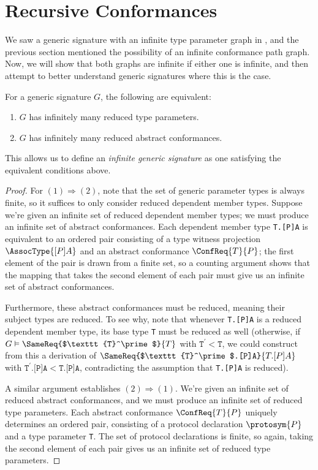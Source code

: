 \documentclass[../generics]{subfiles}
\begin{document}
\section{Recursive Conformances}\label{recursive conformances}

We saw a generic signature with an infinite type parameter graph in , and the previous section mentioned the possibility of an infinite conformance path graph. Now, we will show that both graphs are infinite if either one is infinite, and then attempt to better understand generic signatures where this is the case.

\begin{proposition}\label{infinite signature lemma} For a generic signature $G$, the following are equivalent:
\begin{enumerate}
\item $G$ has infinitely many reduced type parameters.
\item $G$ has infinitely many reduced abstract conformances.
\end{enumerate}
This allows us to define an \emph{infinite generic signature} as one satisfying the equivalent conditions above.
\end{proposition}
\begin{proof}
For $(1)\Rightarrow(2)$, note that the set of generic parameter types is always finite, so it suffices to only consider reduced dependent member types. Suppose we're given an infinite set of reduced dependent member types; we must produce an infinite set of abstract conformances. Each dependent member type \texttt{T.[P]A} is equivalent to an ordered pair consisting of a type witness projection $\AssocType{[P]A}$ and an abstract conformance $\ConfReq{T}{P}$; the first element of the pair is drawn from a finite set, so a counting argument shows that the mapping that takes the second element of each pair must give us an infinite set of abstract conformances.

Furthermore, these abstract conformances must be reduced, meaning their subject types are reduced. To see why, note that whenever \texttt{T.[P]A} is a reduced dependent member type, its base type \texttt{T} must be reduced as well (otherwise, if $G\vDash\SameReq{$\texttt{T}^\prime$}{T}$ with $\texttt{T}^\prime<\texttt{T}$, we could construct from this a derivation of $\SameReq{$\texttt{T}^\prime$.[P]A}{T.[P]A}$ with $\texttt{$\texttt{T}^\prime$.[P]A} < \texttt{T.[P]A}$, contradicting the assumption that \texttt{T.[P]A} is reduced).

A similar argument establishes $(2)\Rightarrow(1)$. We're given an infinite set of reduced abstract conformances, and we must produce an infinite set of reduced type parameters. Each abstract conformance $\ConfReq{T}{P}$ uniquely determines an ordered pair, consisting of a protocol declaration $\protosym{P}$ and a type parameter \texttt{T}. The set of protocol declarations is finite, so again, taking the second element of each pair gives us an infinite set of reduced type parameters.
\end{proof}
\end{document}
